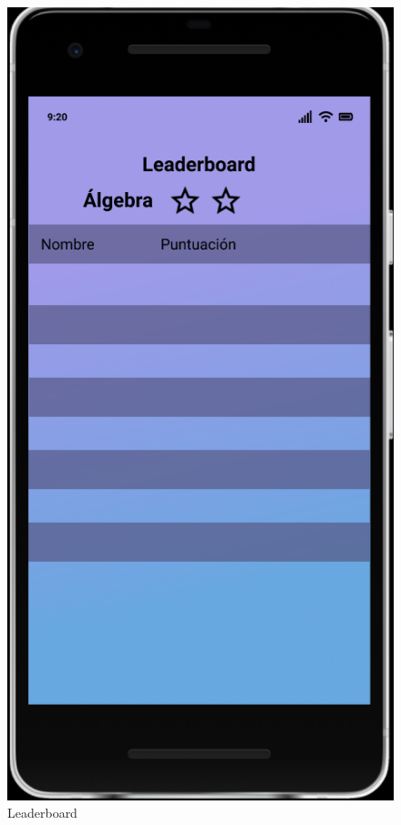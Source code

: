 \documentclass{article}
\begin{document}
\begin{figure}[H]
    \centering
    \includegraphics[scale=0.8]{imgs/Figma/Leaderboard}
    \caption{Leaderboard}
\end{figure}
\end{document}
